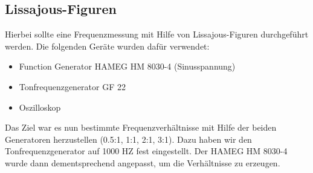 \documentclass[a4paper,11pt]{article}
\begin{document}
\subsection{Lissajous-Figuren}

Hierbei sollte eine Frequenzmessung mit Hilfe von Lissajous-Figuren durchgeführt werden. 
Die folgenden Geräte wurden dafür verwendet:
\begin{itemize}
  \item Function Generator HAMEG HM 8030-4 (Sinusspannung)
  \item Tonfrequenzgenerator GF 22
  \item Oszilloskop
\end{itemize}

Das Ziel war es nun bestimmte Frequenzverhältnisse mit Hilfe der beiden Generatoren herzustellen (0.5:1, 1:1, 2:1, 3:1). 
Dazu haben wir den Tonfrequenzgenerator auf 1000 HZ fest eingestellt. Der HAMEG HM 8030-4 wurde dann dementsprechend angepasst, um die Verhältnisse zu erzeugen.   

\begin{figure}[h!]
  \\ 
\end{figure}
\end{document}

